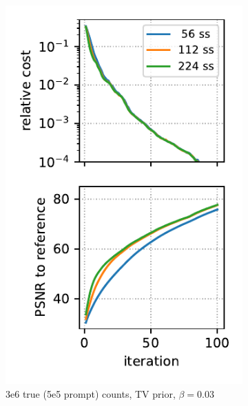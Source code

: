 \begin{figure}
\begin{subfigure}[b]{0.23\textwidth}
    \includegraphics[width=1.0\textwidth]{./figs/brain2d_counts_3.0E+06_seed_1_beta_3.0E-02_prior_TV_niter_ref_20000_fwhm_4.5_4.5_niter_100_ss.pdf}
    \caption{3e6 true (5e5 prompt) counts, TV prior, $\beta = 0.03$}
  \end{subfigure}
  \hfill
  \begin{subfigure}[b]{0.23\textwidth}
    \centering

\end{subfigure}
\end{figure}
